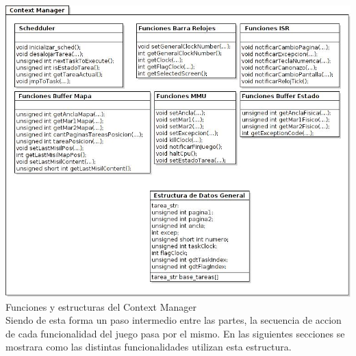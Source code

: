 \includegraphics[scale=0.5]{diagramas/contextManager.jpg}   
\\Funciones y estructuras del Context Manager\\


Siendo de esta forma un paso intermedio entre las partes, la secuencia de accion de cada funcionalidad del juego pasa por el mismo. En las siguientes secciones se mostrara como las distintas funcionalidades utilizan esta estructura.
